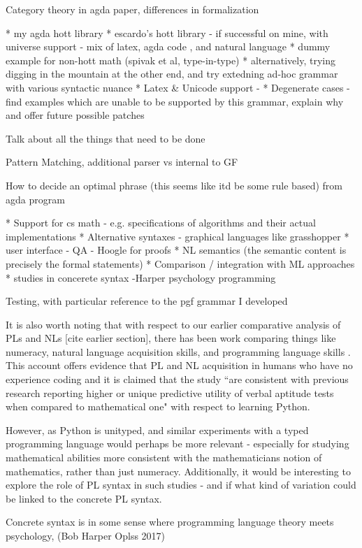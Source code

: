 
Category theory in agda paper, differences in formalization

* my agda hott library
* escardo's hott library 
  - if successful on mine, with universe support
  - mix of latex, agda code , and natural language 
* dummy example for non-hott math (spivak et al, type-in-type)
* alternatively, trying digging in the mountain at the other end, and try extedning ad-hoc grammar with various syntactic nuance
* Latex & Unicode support  - 
* Degenerate cases
  - find examples which are unable to be supported by this grammar, explain why and offer future possible patches

Talk about all the things that need to be done

Pattern Matching, additional parser vs internal to GF

How to decide an optimal phrase (this seems like itd be some rule based) from agda program

* Support for cs math - e.g. specifications of algorithms and their actual implementations
* Alternative syntaxes - graphical languages like grasshopper
* user interface
  - QA
  - Hoogle for proofs
* NL semantics (the semantic content is precisely the formal statements)
* Comparison / integration with ML approaches
* studies in concerete syntax -Harper psychology {\intersect} programming

Testing, with particular reference to the pgf grammar I developed


It is also worth noting that with respect to our earlier comparative analysis
of PLs and NLs [cite earlier section], there has been work comparing things like
numeracy, natural language acquisition skills, and programming language skills
\cite{prat2020relating}.  This account offers evidence that PL and NL acquisition
in humans who have no experience coding 
and it is claimed that the study ``are consistent with previous research
reporting higher or unique predictive utility of verbal aptitude tests when
compared to mathematical one" with respect to learning Python.

However, as Python is unityped, and similar experiments with a typed programming
language would perhaps be more relevant - especially for studying mathematical
abilities more consistent with the mathematicians notion of mathematics, rather
than just numeracy. Additionally, it would be interesting to explore the role of
PL syntax in such studies - and if what kind of variation could be linked to the
concrete PL syntax.

Concrete syntax is in some sense where programming language theory meets
psychology, (Bob Harper Oplss 2017)
